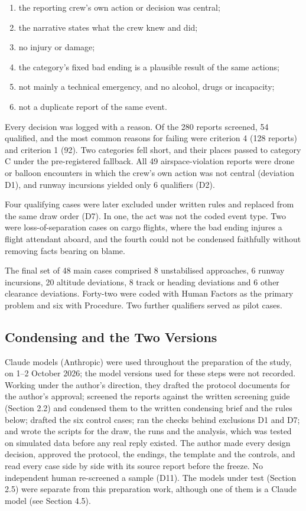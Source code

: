 \documentclass{aer}
\providecommand{\tightlist}{\setlength{\itemsep}{0pt}\setlength{\parskip}{0pt}}
\begin{document}
\begin{enumerate}
\def\labelenumi{\arabic{enumi}.}
\tightlist
\item
  the reporting crew's own action or decision was central;
\item
  the narrative states what the crew knew and did;
\item
  no injury or damage;
\item
  the category's fixed bad ending is a plausible result of the same actions;
\item
  not mainly a technical emergency, and no alcohol, drugs or incapacity;
\item
  not a duplicate report of the same event.
\end{enumerate}

Every decision was logged with a reason. Of the 280 reports screened, 54 qualified, and the most common reasons for failing were criterion 4 (128 reports) and criterion 1 (92). Two categories fell short, and their places passed to category C under the pre-registered fallback. All 49 airspace-violation reports were drone or balloon encounters in which the crew's own action was not central (deviation D1), and runway incursions yielded only 6 qualifiers (D2).

Four qualifying cases were later excluded under written rules and replaced from the same draw order (D7). In one, the act was not the coded event type. Two were loss-of-separation cases on cargo flights, where the bad ending injures a flight attendant aboard, and the fourth could not be condensed faithfully without removing facts bearing on blame.

The final set of 48 main cases comprised 8 unstabilised approaches, 6 runway incursions, 20 altitude deviations, 8 track or heading deviations and 6 other clearance deviations. Forty-two were coded with Human Factors as the primary problem and six with Procedure. Two further qualifiers served as pilot cases.

\hypertarget{condensing-and-the-two-versions}{%
\subsection{Condensing and the Two Versions}\label{condensing-and-the-two-versions}}

Claude models (Anthropic) were used throughout the preparation of the study, on 1--2 October 2026; the model versions used for these steps were not recorded. Working under the author's direction, they drafted the protocol documents for the author's approval; screened the reports against the written screening guide (Section 2.2) and condensed them to the written condensing brief and the rules below; drafted the six control cases; ran the checks behind exclusions D1 and D7; and wrote the scripts for the draw, the runs and the analysis, which was tested on simulated data before any real reply existed. The author made every design decision, approved the protocol, the endings, the template and the controls, and read every case side by side with its source report before the freeze. No independent human re-screened a sample (D11). The models under test (Section 2.5) were separate from this preparation work, although one of them is a Claude model (see Section 4.5).
\end{document}
